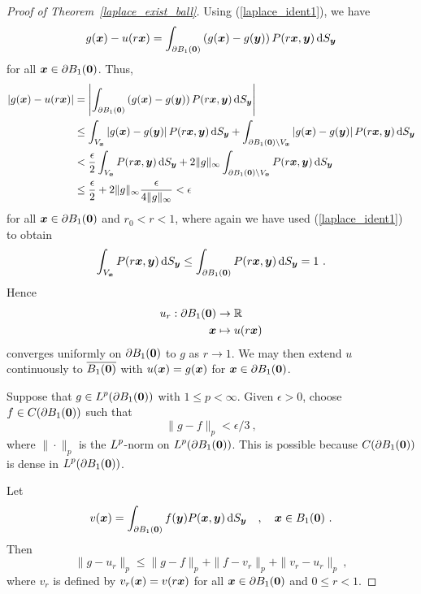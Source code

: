 \begin{proof}[Proof of Theorem~\ref{laplace_exist_ball}]
Using (\ref{laplace_ident1}), we have
\[
g({\bm{x}}) - u(r{\bm{x}})
=\int_{\partial B_1({\bm{0}})} \left( g({\bm{x}}) -g({\bm{y}})\right)
P(r{\bm{x}},{\bm{y}}) \,\mathrm{d}{S}_{{\bm{y}}}
\]
for all ${\bm{x}} \in \partial B_1({\bm{0}})$.  Thus,
\begin{align*}
\left| g({\bm{x}}) - u(r{\bm{x}})\right|
&= \left| \int_{\partial B_1({\bm{0}})} \left( g({\bm{x}}) -g({\bm{y}})\right)
P(r{\bm{x}},{\bm{y}}) \,\mathrm{d}{S}_{{\bm{y}}} \right| \\
&\leq \int_{V_{{\bm{x}}}} \left| g({\bm{x}}) -g({\bm{y}})\right|
P(r{\bm{x}},{\bm{y}}) \,\mathrm{d}{S}_{{\bm{y}}}
+\int_{\partial B_1({\bm{0}})\setminus V_{{\bm{x}}}}
\left| g({\bm{x}}) -g({\bm{y}})\right| P(r{\bm{x}},{\bm{y}}) \,\mathrm{d}{S}_{{\bm{y}}} \\
&< \frac{\epsilon}{2} \int_{V_{{\bm{x}}}} P(r{\bm{x}},{\bm{y}})
\,\mathrm{d}{S}_{{\bm{y}}} + 2 \|g\|_{\infty}
\int_{\partial B_1({\bm{0}})\setminus V_{{\bm{x}}}} P(r{\bm{x}},{\bm{y}})
\,\mathrm{d}{S}_{{\bm{y}}} \\
&\leq \frac{\epsilon}{2} + 2 \|g\|_{\infty}
\frac{\epsilon}{4\|g\|_{\infty}} < \epsilon
\end{align*}
for all ${\bm{x}} \in \partial B_1({\bm{0}})$ and $r_0<r<1$, where again
we have used (\ref{laplace_ident1}) to obtain
\[
\int_{V_{\VEC{x}}} P(r\VEC{x},\VEC{y}) \dss{S}{y}
\leq \int_{\partial B_1(\VEC{0})} P(r\VEC{x},\VEC{y}) \dss{S}{y} = 1 \ .
\]
Hence
\begin{align*}
u_r: \partial B_1({\bm{0}}) &\rightarrow \mathbb{R} \\
{\bm{x}} &\mapsto u(r{\bm{x}})
\end{align*}
converges uniformly on $\partial B_1({\bm{0}})$ to $g$ as
$r\rightarrow 1$.  We may then extend $u$ continuously to
$\overline{B_1({\bm{0}})}$ with
$u({\bm{x}})=g({\bm{x}})$ for ${\bm{x}}\in \partial B_1({\bm{0}})$.

  Suppose that $\displaystyle g\in L^p(\partial B_1({\bm{0}}))$ with
$1\leq p < \infty$.  Given $\epsilon>0$, choose
$f\in C(\partial B_1({\bm{0}}))$ such that
\begin{equation} \label{laplace_ident2}
\|g-f\|_p < \epsilon/3 \ , 
\end{equation}
where $\|\cdot\|_p$ is the $\displaystyle L^p$-norm on
$\displaystyle L^p(\partial B_1({\bm{0}}))$.
This is possible because $C(\partial B_1({\bm{0}}))$ is dense in
$\displaystyle L^p(\partial B_1({\bm{0}}))$.

Let
\[
v({\bm{x}}) = \int_{\partial B_1({\bm{0}})} f({\bm{y}})
P({\bm{x}},{\bm{y}}) \,\mathrm{d}{S}_{{\bm{y}}}
\quad , \quad {\bm{x}} \in B_1({\bm{0}}) \ .
\]
Then
\begin{equation} \label{laplace_ident5}
\|g-u_r\|_p \leq \| g - f \|_p + \| f - v_r \|_p + \| v_r - u_r\|_p \ ,
\end{equation}
where $v_r$ is defined by $v_r({\bm{x}}) = v(r{\bm{x}})$ for all
${\bm{x}} \in \partial B_1({\bm{0}})$ and $0 \leq r < 1$.


\end{proof}
